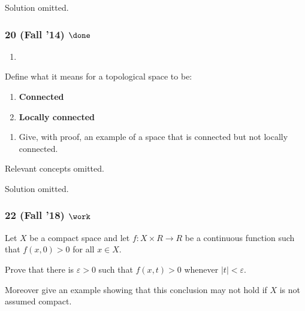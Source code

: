 Solution omitted.

\hypertarget{fall-14-done}{%
\subsubsection{\texorpdfstring{20 (Fall '14)
\(\done\)}{20 (Fall '14) \textbackslash done}}\label{fall-14-done}}

\begin{problem}[?]

\begin{enumerate}
\def\labelenumi{\alph{enumi}.}
\tightlist
\item
\end{enumerate}

Define what it means for a topological space to be:

\begin{enumerate}
\def\labelenumi{\roman{enumi}.}
\item
  \textbf{Connected}
\item
  \textbf{Locally connected}
\end{enumerate}

\begin{enumerate}
\def\labelenumi{\alph{enumi}.}
\setcounter{enumi}{1}
\tightlist
\item
  Give, with proof, an example of a space that is connected but not
  locally connected.
\end{enumerate}

\end{problem}


Relevant concepts omitted.

Solution omitted.

\hypertarget{fall-18-work}{%
\subsubsection{\texorpdfstring{22 (Fall '18)
\(\work\)}{22 (Fall '18) \textbackslash work}}\label{fall-18-work}}

\begin{problem}[?]

Let \(X\) be a compact space and let \(f : X \times R \to R\) be a
continuous function such that \(f (x, 0) > 0\) for all \(x \in X\).

Prove that there is \(\varepsilon> 0\) such that \(f (x, t) > 0\)
whenever \({\left\lvert {t} \right\rvert} < \varepsilon\).

Moreover give an example showing that this conclusion may not hold if
\(X\) is not assumed compact.

\end{problem}

